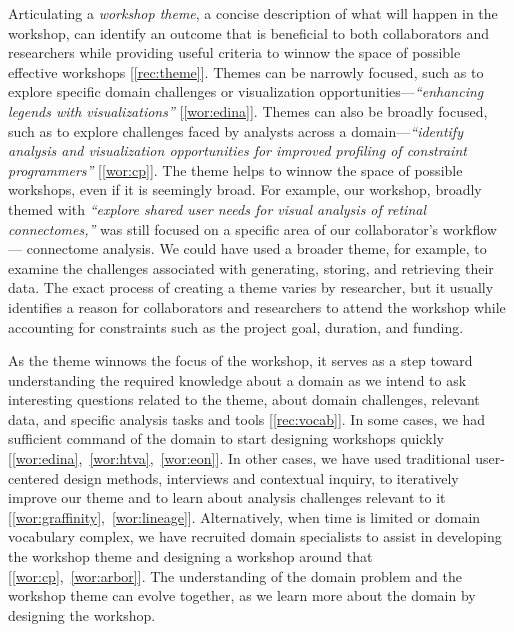 Articulating a \emph{workshop theme}, a concise description of what will happen in the workshop, can identify an outcome that is beneficial to both collaborators and researchers while providing useful criteria to winnow the space of possible effective workshops [\ref{rec:theme}]. Themes can be narrowly focused, such as to explore specific domain challenges or visualization opportunities---\emph{``enhancing legends with visualizations''} [\ref{wor:edina}]. Themes can also be broadly focused, such as to explore challenges faced by analysts across a domain---\emph{``identify analysis and visualization opportunities for improved profiling of constraint programmers''} [\ref{wor:cp}]. The theme helps to winnow the space of possible workshops, even if it is seemingly broad. For example, our workshop, broadly themed with \emph{``explore shared user needs for visual analysis of retinal connectomes,''} was still focused on a specific area of our collaborator's workflow --- connectome analysis. We could have used a broader theme, for example, to examine the challenges associated with generating, storing, and retrieving their data. The exact process of creating a theme varies by researcher, but it usually identifies a reason for collaborators and researchers to attend the workshop while accounting for constraints such as the project goal, duration, and funding.

As the theme winnows the focus of the workshop, it serves as a step toward understanding the required knowledge about a domain as we intend to ask interesting questions related to the theme, about domain challenges, relevant data, and specific analysis tasks and tools [\ref{rec:vocab}]. In some cases, we had sufficient command of the domain to start designing workshops quickly [\ref{wor:edina},~\ref{wor:htva},~\ref{wor:eon}]. In other cases, we have used traditional user-centered design methods, interviews and contextual inquiry, to iteratively improve our theme and to learn about analysis challenges relevant to it [\ref{wor:graffinity},~\ref{wor:lineage}]. Alternatively, when time is limited or domain vocabulary complex, we have recruited domain specialists to assist in developing the workshop theme and designing a workshop around that [\ref{wor:cp},~\ref{wor:arbor}]. The understanding of the domain problem and the workshop theme can evolve together, as we learn more about the domain by designing the workshop.

